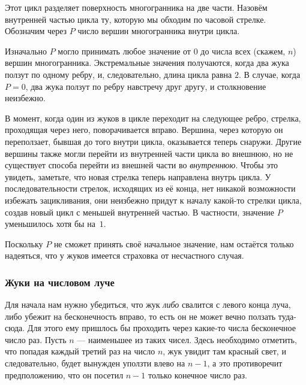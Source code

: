 Этот цикл разделяет поверхность многогранника на две части.
Назовём внутренней частью цикла ту, которую мы обходим по часовой стрелке.
Обозначим через $P$ число вершин многогранника внутри цикла.

Изначально $P$ могло принимать любое значение от $0$ до числа всех (скажем, $n$) вершин многогранника.
Экстремальные значения получаются, когда два жука ползут по одному ребру, и, следовательно, длина цикла равна $2$.
В случае, когда $P=0$, два жука ползут по ребру навстречу друг другу, и столкновение неизбежно.

В момент, когда один из жуков в цикле переходит на следующее ребро, стрелка, проходящая через него, поворачивается вправо.
Вершина, через которую он переползает, бывшая до того внутри цикла, оказывается теперь снаружи.
Другие вершины также могли перейти из внутренней части цикла во внешнюю, но не существует способа перейти из внешней части во \emph{внутреннюю}.
Чтобы это увидеть, заметьте, что новая стрелка теперь направлена внутрь цикла.
У последовательности стрелок, исходящих из её конца, нет никакой возможности избежать зацикливания, они неизбежно придут к началу какой-то стрелки цикла, создав новый цикл с меньшей внутренней частью.
В частности, значение $P$ уменьшилось хотя бы на~$1$.

{

\sloppy

Поскольку $P$ не сможет принять своё начальное значение, нам остаётся только надеяться, что у жуков имеется страховка от несчастного случая.
\heart

}

\subsubsection*{Жуки на числовом луче}%

Для начала нам нужно убедиться, что жук \emph{либо} свалится с левого конца луча, либо убежит на бесконечность вправо, то есть он не может вечно ползать туда-сюда.
Для этого ему пришлось бы проходить через какие-то числа бесконечное число раз.
Пусть $n$ --- наименьшее из таких чисел.
Здесь необходимо отметить, что попадая каждый третий раз на число $n$, жук увидит там красный свет, и следовательно, будет вынужден уползти влево на $n-1$, а это противоречит предположению, что он посетил $n-1$ только конечное число раз.

